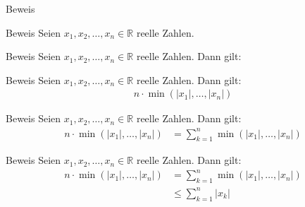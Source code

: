 \documentclass[10pt]{beamer}
\def\bR{\mathbb{R}}
\begin{document}
\begin{frame}{Beweis}
    
\end{frame}



\begin{frame}{Beweis}
    Seien \( x_{1}, x_{2}, \ldots, x_{n} \in \bR \) reelle Zahlen. 
\end{frame}



\begin{frame}{Beweis}
    Seien \( x_{1}, x_{2}, \ldots, x_{n} \in \bR \) reelle Zahlen. Dann gilt: 
\end{frame}



\begin{frame}{Beweis}
    Seien \( x_{1}, x_{2}, \ldots, x_{n} \in \bR \) reelle Zahlen. Dann gilt:
    \begin{align*}
        n \cdot \min\left( \left\vert x_{1} \right\vert, \ldots, \left\vert x_{n} \right\vert \right)
    \end{align*}
\end{frame}



\begin{frame}{Beweis}
    Seien \( x_{1}, x_{2}, \ldots, x_{n} \in \bR \) reelle Zahlen. Dann gilt:
    \begin{align*}
        n \cdot \min\left( \left\vert x_{1} \right\vert, \ldots, \left\vert x_{n} \right\vert \right)
        & = \sum_{k = 1}^{n} \min\left( \left\vert x_{1} \right\vert, \ldots, \left\vert x_{n} \right\vert \right) 
    \end{align*}
\end{frame}



\begin{frame}{Beweis}
    Seien \( x_{1}, x_{2}, \ldots, x_{n} \in \bR \) reelle Zahlen. Dann gilt:
    \begin{align*}
        n \cdot \min\left( \left\vert x_{1} \right\vert, \ldots, \left\vert x_{n} \right\vert \right)
        & = \sum_{k = 1}^{n} \min\left( \left\vert x_{1} \right\vert, \ldots, \left\vert x_{n} \right\vert \right) \\
        & \leq \sum_{k = 1}^{n} \left\vert x_{k} \right\vert
    \end{align*}
\end{frame}
\end{document}
